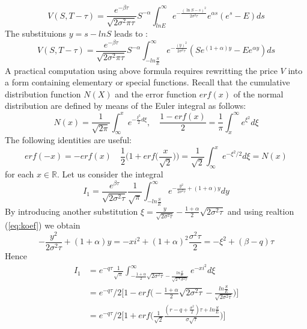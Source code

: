 \documentclass[a4paper]{article}
\begin{document}
\begin{itemize}
    \begin{equation}
        V(S, T-\tau)=\frac{e^{-\beta \tau}}{\sqrt{2 \sigma^{2} \pi \tau}} S^{-\alpha} \int_{ln E}^{\infty} e^{-\frac{(\ln S-s)^{2}}{2 \sigma^{2} \tau}} e^{\alpha s} \left(e^{s}- E\right) d s
    \end{equation}
The substituions $y=s-lnS$ leads to :
    \begin{equation}
        V(S, T-\tau)=\frac{e^{-\beta \tau}}{\sqrt{2 \sigma^{2} \pi \tau}} S^{-\alpha} \int_{-ln \frac{S}{E}}^{\infty} e^{-\frac{(y)^{2}}{2 \sigma^{2} \tau}}  \left(Se^{(1+\alpha)y}- E e^{\alpha y}\right) d s
    \end{equation}
A practical computation using above formula requires rewritting the price $V$ into a form containing elementary or special functions. Recall that the cumulative distribution function $N(X)$ 
and the error function $erf(x)$ of the normal distribution are defined by means of the Euler integral as follows:
\begin{equation}
    N(x) = \frac{1}{\sqrt{2 \pi}} \int_{\infty}^{x} e^{-\frac{\xi^2}{2}d\xi}, \quad \frac{1-erf(x)}{2} = \frac{1}{\pi} \int_{x}^{\infty} e^{\xi^2} d\xi
\end{equation}
The following identities are useful:
\begin{equation}
    erf(-x) = -erf(x) \quad \frac{1}{2} \bigg(1 + erf \bigg( \frac{x}{\sqrt{2}} \bigg)\bigg) = \frac{1}{\sqrt{2}} \int_{\infty}^{x} e^{-\xi^2/2} d\xi = N(x)
\end{equation}
for each $x \in \mathbb{R}$.
Let us consider the integral
\begin{equation}
    I_1 = \frac{e^{\beta \tau}}{\sqrt{2\sigma^2 \tau}} \frac{1}{\sqrt{\pi}} \int_{-ln\frac{S}{E}}^{\infty} e^{ -\frac{y^2}{2\sigma^2 \tau} + (1 + \alpha)y}dy
\end{equation}
By introducing another substitution $\xi = \frac{y}{\sqrt{2\sigma^2 \tau}} - \frac{1 + \alpha}{2} \sqrt{2\sigma^2 \tau}$ and using realtion (\ref{eq:koef}) we obtain
\begin{equation}
    - \frac{y^2}{2\sigma^2 \tau} + (1 + \alpha)y = -xi^2 + (1 + \alpha)^2 \frac{\sigma^2 \tau }{2} = -\xi^2 + (\beta - q) \tau
\end{equation}
Hence 
\begin{align}
    I_1 &= e^{-q \tau } \frac{1}{\sqrt{\pi}} \int_{-\frac{1+\alpha}{2} \sqrt{2\sigma^2 \tau}- \frac{ln \frac{S}{E}}{\sqrt{2*\sigma^2 \tau}}}^{\infty} e^{-xi^2} d\xi\\
        &= e^{-q \tau }/2 \bigg[ 1 - erf \bigg(-\frac{1 + \alpha }{2} \sqrt{2 \sigma^2 \tau} - \frac{ln \frac{S}{E}}{\sqrt{2 \sigma^2 \tau}} \bigg) \bigg]\\
        &= e^{-q \tau }/2 \bigg[ 1 + erf \bigg( \frac{1}{\sqrt{2}} \frac{(r - q + \frac{\sigma^2}{2}) \tau + ln \frac{S}{E}}{\sigma \sqrt{\tau}}\bigg)\bigg]\\
\end{align}


\end{itemize}
\end{document}
